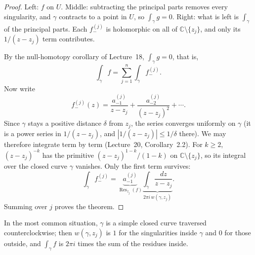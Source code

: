 \documentclass[11pt]{article}
\theoremstyle{plain}
\theoremstyle{definition}
\theoremstyle{remark}
\numberwithin{equation}{section}
\newcommand{\C}{\mathbb{C}}
\newenvironment{lecturefigure}
 {\par\addvspace{0.25em}\begingroup\setlength{\parskip}{0pt}\centering}
 {\par\endgroup\addvspace{0.25em}}
\begin{document}
\begin{proof}
\begin{lecturefigure}
{\small Left: $f$ on $U$. Middle: subtracting the principal parts removes
every singularity, and $\gamma$ contracts to a point in $U$, so
$\int_\gamma g=0$. Right: what is left is $\int_\gamma$ of the principal
parts. Each $f_-^{(j)}$ is holomorphic on all of $\C\setminus\{z_j\}$, and
only its $1/(z-z_j)$ term contributes.}
\end{lecturefigure}

By the null-homotopy corollary of Lecture~18, $\int_\gamma g=0$, that is,
\begin{equation}
 \int_\gamma f=\sum_{j=1}^{n}\int_\gamma f_-^{(j)}.
\end{equation}
Now write
\begin{equation}
 f_-^{(j)}(z)=\frac{a_{-1}^{(j)}}{z-z_j}+\frac{a_{-2}^{(j)}}{(z-z_j)^2}+\cdots.
\end{equation}
Since $\gamma$ stays a positive distance $\delta$ from $z_j$, the series
converges uniformly on $\gamma$ (it is a power series in $1/(z-z_j)$, and
$|1/(z-z_j)|\leq1/\delta$ there). We may therefore integrate term by term
(Lecture~20, Corollary~2.2). For $k\geq2$, $(z-z_j)^{-k}$ has the primitive
$(z-z_j)^{1-k}/(1-k)$ on $\C\setminus\{z_j\}$, so its integral over the
closed curve $\gamma$ vanishes. Only the first term survives:
\begin{equation}
 \int_\gamma f_-^{(j)}
 =\underbrace{a_{-1}^{(j)}}_{\operatorname{Res}_{z_j}(f)}
 \underbrace{\int_\gamma\frac{dz}{z-z_j}}_{2\pi i\,w(\gamma,z_j)}.
\end{equation}
Summing over $j$ proves the theorem.
\end{proof}

In the most common situation, $\gamma$ is a simple closed curve traversed
counterclockwise; then $w(\gamma,z_j)$ is $1$ for the singularities inside
$\gamma$ and $0$ for those outside, and $\int_\gamma f$ is $2\pi i$ times the
sum of the residues inside.
\end{document}
